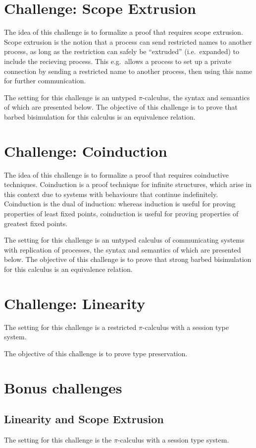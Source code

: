 \documentclass[a4paper]{article}
\begin{document}
\section{Challenge: Scope Extrusion}
The idea of this challenge is to formalize a proof that requires scope extrusion.
Scope extrusion is the notion that a process can send restricted names to another process, as long as the restriction can safely be ``extruded'' (i.e.\ expanded) to include the recieving process.
This e.g.\ allows a process to set up a private connection by sending a restricted name to another process, then using this name for further communication.

The setting for this challenge is an untyped \( \pi \)-calculus, the syntax and semantics of which are presented below.
The objective of this challenge is to prove that barbed bisimulation for this calculus is an equivalence relation.

\section{Challenge: Coinduction}
The idea of this challenge is to formalize a proof that requires coinductive techniques.
Coinduction is a proof technique for infinite structures, which arise in this context due to systems with behaviours that continue indefinitely.
Coinduction is the dual of induction: whereas induction is useful for proving properties of least fixed points, coinduction is useful for proving properties of greatest fixed points.

The setting for this challenge is an untyped calculus of communicating systems with replication of processes, the syntax and semantics of which are presented below.
The objective of this challenge is to prove that strong barbed bisimulation for this calculus is an equivalence relation.

\section{Challenge: Linearity}
The setting for this challenge is a restricted \( \pi \)-calculus with a session type system.

The objective of this challenge is to prove type preservation.

\section{Bonus challenges}

\subsection{Linearity and Scope Extrusion}
The setting for this challenge is the \( \pi \)-calculus with a session type system.
\end{document}
